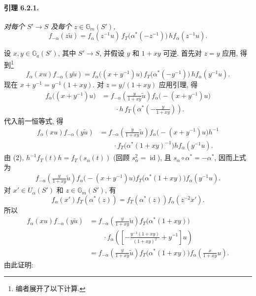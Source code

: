 \paragraph{\textbf{引理 6.2.1.}}
\emph{对每个 \(S'\to S\) 及每个 \(z\in\mathbb G_m(S')\),}
\[
 f_{-\alpha}(z\widetilde u)
 =
 f_\alpha(z^{-1}u)\,
 f_T\bigl(\alpha^\ast(-z^{-1})\bigr)\,
 h f_\alpha(z^{-1}u).
\]

设 \(x,y\in\mathbb G_a(S')\), 其中 \(S'\to S\), 并假设 \(y\) 和 \(1+xy\) 可逆. 首先对 \(z=y\) 应用, 得到\footnote{编者展开了以下计算.}
\[
 f_\alpha(xu)f_{-\alpha}(y\widetilde u)
 =
 f_\alpha\bigl((x+y^{-1})u\bigr)\,
 f_T\bigl(\alpha^\ast(-y^{-1})\bigr)\,
 h f_\alpha(y^{-1}u).
\]
现在 \(x+y^{-1}=y^{-1}(1+xy)\). 对 \(z=y/(1+xy)\) 应用引理, 得
\[
\begin{aligned}
 f_\alpha\bigl((x+y^{-1})u\bigr)
 &=
 f_{-\alpha}\!\left(\frac{y}{1+xy}\widetilde u\right)
 f_\alpha\bigl(-(x+y^{-1})u\bigr)\\
 &\qquad{}\cdot h\,
 f_T\!\left(\alpha^\ast\!\left(-\frac{y}{1+xy}\right)\right).
\end{aligned}
\]
代入前一恒等式, 得
\[
\begin{aligned}
 f_\alpha(xu)f_{-\alpha}(y\widetilde u)
 &=
 f_{-\alpha}\!\left(\frac{y}{1+xy}\widetilde u\right)
 f_\alpha\bigl(-(x+y^{-1})u\bigr)h^{-1}\\
 &\qquad{}\cdot
 f_T\bigl(\alpha^\ast(1+xy)^{-1}\bigr)
 h f_\alpha(y^{-1}u).
\end{aligned}
\]
由 \textup{(2)}, \(h^{-1}f_T(t)h=f_T(s_\alpha(t))\) \textup{(回顾 \(s_\alpha^2=\operatorname{id}\))}, 且 \(s_\alpha\circ\alpha^\ast=-\alpha^\ast\), 因而上式为
\[
\begin{aligned}
 f_{-\alpha}\!\left(\frac{y}{1+xy}\widetilde u\right)
 f_\alpha\bigl(-(x+y^{-1})u\bigr)
 f_T\bigl(\alpha^\ast(1+xy)\bigr)
 f_\alpha(y^{-1}u).
\end{aligned}
\]
对 \(x'\in U_\alpha(S')\) 和 \(z\in\mathbb G_m(S')\), 有
\[
 f_\alpha(x')f_T(\alpha^\ast(z))
 =
 f_T(\alpha^\ast(z))f_\alpha(z^{-2}x').
\]
所以
\[
\begin{aligned}
 f_\alpha(xu)f_{-\alpha}(y\widetilde u)
 &=
 f_{-\alpha}\!\left(\frac{y}{1+xy}\widetilde u\right)
 f_T\bigl(\alpha^\ast(1+xy)\bigr)\\
 &\qquad{}\cdot
 f_\alpha\!\left(
 \left[
 -\frac{y^{-1}(1+xy)}{(1+xy)^2}+y^{-1}
 \right]u
 \right)\\
 &=
 f_{-\alpha}\!\left(\frac{y}{1+xy}\widetilde u\right)
 f_T\bigl(\alpha^\ast(1+xy)\bigr)
 f_\alpha\!\left(\frac{x}{1+xy}u\right).
\end{aligned}
\]
由此证明:

